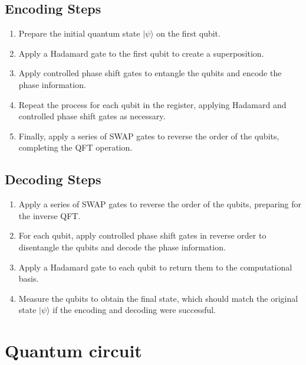 \documentclass[12pt]{article}
\begin{document}
\subsection{Encoding Steps}
\begin{enumerate}
    \item Prepare the initial quantum state \( |\psi\rangle \) on the first qubit.
    \item Apply a Hadamard gate to the first qubit to create a superposition.
    \item Apply controlled phase shift gates to entangle the qubits and encode the phase information.
    \item Repeat the process for each qubit in the register, applying Hadamard and controlled phase shift gates as necessary.
    \item Finally, apply a series of SWAP gates to reverse the order of the qubits, completing the QFT operation.
\end{enumerate}

\subsection{Decoding Steps}
\begin{enumerate}
    \item Apply a series of SWAP gates to reverse the order of the qubits, preparing for the inverse QFT.
    \item For each qubit, apply controlled phase shift gates in reverse order to disentangle the qubits and decode the phase information.
    \item Apply a Hadamard gate to each qubit to return them to the computational basis.
    \item Measure the qubits to obtain the final state, which should match the original state \( |\psi\rangle \) if the encoding and decoding were successful.
\end{enumerate}

\section{Quantum circuit}
\end{document}
